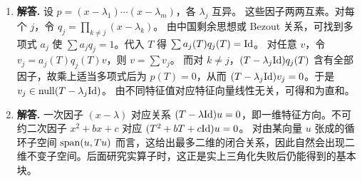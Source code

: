 \begin{enumerate}[label=\textbf{\arabic*.}, leftmargin=*, itemsep=1em]
$a(T)(T-2\Id)+b(T)(T+\Id)=\Id$。
对任意 $v$，令
$u=b(T)(T+\Id)v$，$w=a(T)(T-2\Id)v$，则 $v=u+w$。
再由 $(T-2\Id)(T+\Id)=0$ 以及多项式算子可交换，得
$(T-2\Id)u=0$，$(T+\Id)w=0$，故 $Tu=2u$，$Tw=-w$。
\item \textbf{解答.} 设
$p=(x-\lambda_1)\cdots(x-\lambda_m)$，各 $\lambda_j$ 互异。
这些因子两两互素。对每个 $j$，令
$q_j=\prod_{k\ne j}(x-\lambda_k)$。
由中国剩余思想或 Bezout 关系，可找到多项式 $a_j$ 使
$\sum a_jq_j=1$。代入 $T$ 得
$\sum a_j(T)q_j(T)=\mathrm{Id}$。
对任意 $v$，令 $v_j=a_j(T)q_j(T)v$，则 $v=\sum v_j$。
而对 $k\ne j$，$(T-\lambda_j\mathrm{Id})q_j(T)$ 含有全部因子，故乘上适当多项式后为 $p(T)=0$，从而
$(T-\lambda_j\mathrm{Id})v_j=0$。于是 $v_j\in \mathrm{null}(T-\lambda_j\mathrm{Id})$。
由不同特征值对应特征向量线性无关，可得和为直和。
\item \textbf{解答.} 一次因子 $(x-\lambda)$ 对应关系 $(T-\lambda\mathrm{Id})u=0$，即一维特征方向。不可约二次因子 $x^2+bx+c$ 对应
$(T^2+bT+c\mathrm{Id})u=0$。
对由某向量 $u$ 张成的循环子空间 $\operatorname{span}(u,Tu)$ 而言，这给出最多二维的闭合关系，因此自然会出现二维不变子空间。后面研究实算子时，这正是实上三角化失败后仍能得到的基本块。
\end{enumerate}
